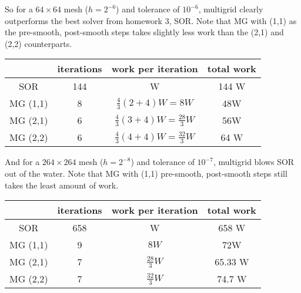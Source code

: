 \documentclass[12pt]{article}
\begin{document}
So for a $64\times64$ mesh ($h=2^{-6}$) and tolerance of $10^{-6}$, multigrid clearly outperforms the best solver from homework 3, SOR.  Note that MG with (1,1) as the pre-smooth, post-smooth steps takes slightly less work than the (2,1) and (2,2) counterparts.
\begin{center}
\begin{tabular}{||c|c|c|c||}
\hline \hline
 & iterations & work per iteration & total work \\
\hline \hline
SOR & 144 & W & 144 W \\
MG (1,1) & 8 & $\frac{4}{3}(2+4)W = 8W$ & 48W \\
MG (2,1) & 6 & $\frac{4}{3}(3+4)W = \frac{28}{3}W$ & 56W \\
MG (2,2) & 6 & $\frac{4}{3}(4+4)W = \frac{32}{3}W$ & 64 W\\
\hline \hline
\end{tabular}
\end{center}

And for a $264\times264$ mesh ($h=2^{-8}$) and tolerance of $10^{-7}$, multigrid blows SOR out of the water. Note that MG with (1,1) pre-smooth, post-smooth steps still takes the least amount of work.
\begin{center}
\begin{tabular}{||c|c|c|c||}
\hline \hline
 & iterations & work per iteration & total work \\
\hline \hline
SOR & 658 & W & 658 W \\
MG (1,1) & 9 & $8W$ & 72W \\
MG (2,1) & 7 & $\frac{28}{3}W$ & 65.33 W \\
MG (2,2) & 7 & $\frac{32}{3}W$ & 74.7 W\\
\hline \hline
\end{tabular}
\end{center}
\end{document}
